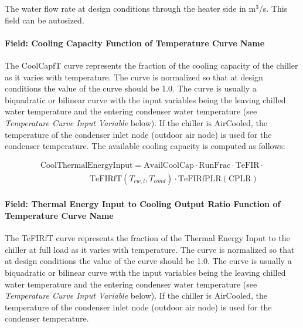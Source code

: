 The water flow rate at design conditions through the heater side in m\(^{3}\)/s. This field can be autosized.

\paragraph{Field: Cooling Capacity Function of Temperature Curve Name}\label{field-cooling-capacity-function-of-temperature-curve-name-3}

The CoolCapfT curve represents the fraction of the cooling capacity of the chiller as it varies with temperature. The curve is normalized so that at design conditions the value of the curve should be 1.0. The curve is usually a biquadratic or bilinear curve with the input variables being the leaving chilled water temperature and the entering condenser water temperature (see \emph{Temperature Curve Input Variable} below). If the chiller is AirCooled, the temperature of the condenser inlet node (outdoor air node) is used for the condenser temperature. The available cooling capacity is computed as follows:

\begin{equation}
    \begin{array}{l}
        \mathrm{CoolThermalEnergyInput} = \mathrm{AvailCoolCap} \cdot \mathrm{RunFrac} \cdot \mathrm{TeFIR} \cdot \\
        \quad \quad \quad \quad \quad \quad \mathrm{TeFIRfT} \left( T_{cw,l}, T_{cond} \right) \cdot \mathrm{TeFIRfPLR}( \mathrm{CPLR} )
    \end{array}
\end{equation}

\paragraph{Field: Thermal Energy Input to Cooling Output Ratio Function of Temperature Curve Name}\label{field-thermal-energy-input-to-cooling-output-ratio-function-of-temperature-curve-name}

The TeFIRfT curve represents the fraction of the Thermal Energy Input to the chiller at full load as it varies with temperature. The curve is normalized so that at design conditions the value of the curve should be 1.0. The curve is usually a biquadratic or bilinear curve with the input variables being the leaving chilled water temperature and the entering condenser water temperature (see \emph{Temperature Curve Input Variable} below). If the chiller is AirCooled, the temperature of the condenser inlet node (outdoor air node) is used for the condenser temperature.

